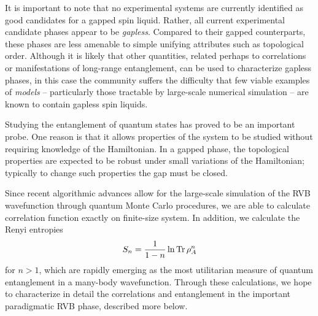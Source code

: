 \documentclass[11pt]{iopart}
\begin{document}
It is important to note that no experimental systems are currently identified as good candidates for a gapped spin liquid.  Rather, all current experimental candidate phases appear to be {\it gapless}.  Compared to their gapped counterparts, these phases are less amenable to simple unifying attributes such as topological order.  Although it is likely that other quantities, related perhaps to correlations or manifestations of long-range entanglement, can be used to characterize gapless phases, in this case the community suffers the difficulty that few viable examples of {\it models} -- particularly those tractable by large-scale numerical simulation -- are known to contain gapless spin liquids.



Studying the entanglement of quantum states has proved to be an important probe. One reason is that it allows properties of the system to be studied without requiring knowledge of the Hamiltonian. In a gapped phase, the topological properties are expected to be robust under small variations of the Hamiltonian; typically to change such properties the gap must be closed.


Since recent algorithmic advances allow for the large-scale simulation of the RVB wavefunction through quantum Monte Carlo procedures, we are able to calculate correlation function exactly on finite-size system.  In addition, we calculate the Renyi entropies
\begin{equation}
S_n=\frac{1}{1-n} \ln {\rm Tr}\, \rho_A^n
\end{equation}
for $n>1$, which are rapidly emerging as the most utilitarian measure of quantum entanglement in a many-body wavefunction.  Through these calculations, we hope to characterize in detail the correlations and entanglement in the important paradigmatic RVB phase, described more below.
\end{document}
